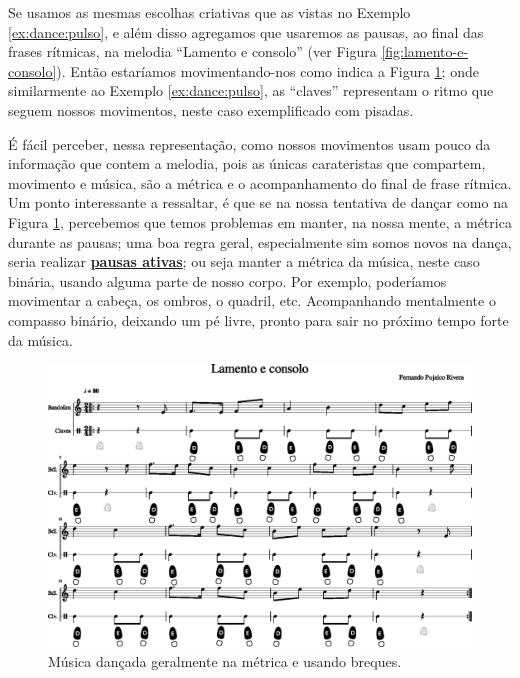 \begin{example}
\label{ex:ritmo:usingbreak}
Se usamos as mesmas escolhas criativas que as vistas no Exemplo \ref{ex:dance:pulso},
e além disso agregamos que usaremos as pausas, ao final das frases rítmicas,
 na melodia ``Lamento e consolo'' (ver Figura \ref{fig:lamento-e-consolo}). 
Então estaríamos movimentando-nos como indica a Figura \ref{fig:lamentoconsolopulsobreak1};
onde similarmente ao Exemplo \ref{ex:dance:pulso},
as ``claves'' representam o ritmo que seguem nossos movimentos,
neste caso exemplificado com pisadas.

É fácil perceber, nessa representação, 
como nossos movimentos usam pouco da informação que contem a melodia, 
pois as únicas carateristas que compartem, movimento e música, 
são a métrica e o acompanhamento do final de frase rítmica.
Um ponto interessante a ressaltar,
 é que se na nossa tentativa de dançar como na Figura \ref{fig:lamentoconsolopulsobreak1}, 
percebemos que temos problemas em manter, na nossa mente, a métrica durante as pausas; 
uma boa regra geral, especialmente sim somos novos na dança, 
seria realizar \hyperref[ref:pausaativa]{\textbf{pausas ativas}};
ou seja manter a métrica da música, neste caso binária, usando alguma parte de nosso corpo.
Por exemplo, poderíamos movimentar a cabeça, os ombros, o quadril, etc.
Acompanhando mentalmente o compasso binário,
deixando um pé livre, pronto para sair no próximo tempo forte da música.
\end{example}
\begin{figure}
    \centering
    \includegraphics[width=\textwidth]{chapters/cap-musicalidade-tecnica/lamento-e-consolo-clave-pulso+break-1.eps}
    \caption{Música dançada geralmente na métrica e usando breques.}
    \label{fig:lamentoconsolopulsobreak1}
\end{figure}
